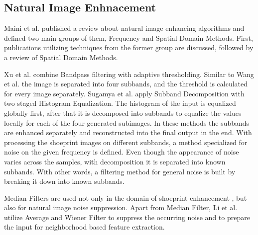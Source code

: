 \documentclass[draft,final]{vutinfth} %
\begin{document}


\subsection{Natural Image Enhnacement}
\par
Maini et al. \cite{maini2010comprehensive} published a review about natural image enhancing algorithms and defined two main groups of them, Frequency and Spatial Domain Methods.
First, publications utilizing techniques from the former group are discussed, followed by a review of Spatial Domain Methods. 
\par
Xu et al. \cite{xu2016image} combine Bandpass filtering with adaptive thresholding.
Similar to Wang et al. \cite{wang2014enhanced} the image is separated into four subbands, and the threshold is calculated for every image separately.
Sugamya et al. \cite{sugamya2016image} apply Subband Decomposition with two staged Histogram Equalization.
The histogram of the input is equalized globally first, after that it is decomposed into subbands to equalize the values locally for each of the four generated subimages.
In these methods the subbands are enhanced separately and reconstructed into the final output in the end.
With processing the shoeprint images on different subbands, a method specialized for noise on the given frequency is defined.
Even though the appearance of noise varies across the samples, with decomposition it is separated into known subbands.
With other words, a filtering method for general noise is built by breaking it down into known subbands.  
\par
Median Filters are used not only in the domain of shoeprint enhancement \cite{alizadeh2017automatic}, but also for natural image noise suppression.
Apart from Median Filter, Li et al. \cite{li2014rapid} utilize Average and Wiener Filter to suppress the occurring noise and to prepare the input for neighborhood based feature extraction.
\end{document}
